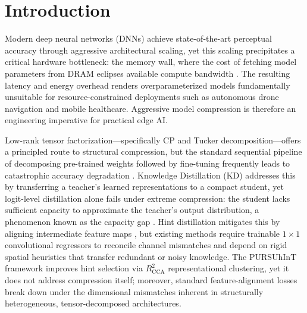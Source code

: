 \documentclass[conference]{IEEEtran}
\begin{document}




\section{Introduction}
\label{sec:intro}

\par
Modern deep neural networks (DNNs) achieve state-of-the-art perceptual
accuracy through aggressive architectural scaling, yet this scaling
precipitates a critical hardware bottleneck: the memory wall, where the cost
of fetching model parameters from DRAM eclipses available compute bandwidth
\cite{gholami2024ai}. The resulting latency and energy overhead renders
overparameterized models fundamentally unsuitable for resource-constrained
deployments such as autonomous drone navigation and mobile healthcare.
Aggressive model compression is therefore an engineering imperative for
practical edge AI.

\par
Low-rank tensor factorization—specifically CP and Tucker decomposition—offers a principled route to structural compression, but the standard sequential pipeline of decomposing pre-trained weights
followed by fine-tuning frequently leads to catastrophic accuracy degradation
\cite{gusak2019automated}. Knowledge Distillation (KD)
\cite{hinton2015distilling} addresses this by transferring a teacher's learned
representations to a compact student, yet logit-level distillation alone fails
under extreme compression: the student lacks sufficient capacity to
approximate the teacher's output distribution, a phenomenon known as the
capacity gap \cite{mirzadeh2020improved}. Hint distillation mitigates this by
aligning intermediate feature maps \cite{romero2015fitnetshintsdeepnets}, but
existing methods require trainable $1\!\times\!1$ convolutional regressors to
reconcile channel mismatches and depend on rigid spatial heuristics that
transfer redundant or noisy knowledge. The PURSUhInT framework
\cite{keser2023pursuhint} improves hint selection via $R^2_\text{CCA}$
representational clustering, yet it does not address compression itself;
moreover, standard feature-alignment losses break down under the dimensional
mismatches inherent in structurally heterogeneous, tensor-decomposed
architectures.
\end{document}
